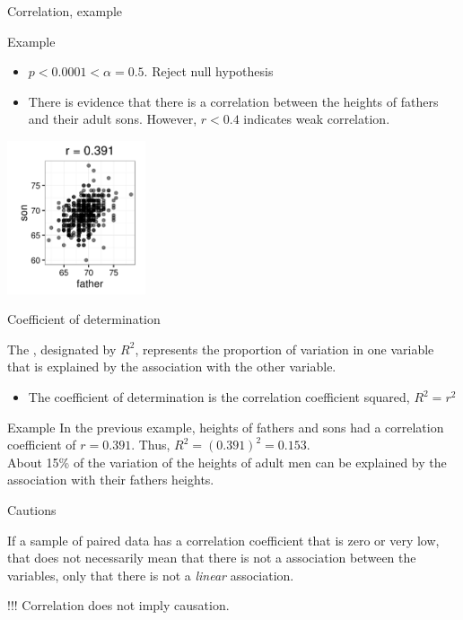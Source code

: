 \documentclass[xcolor=table, aspectratio=169, bigger]{beamer}
\begin{document}
\begin{frame}{Correlation, example}
\begin{exampleblock}{Example}
\begin{itemize}
\item $p < 0.0001 < \alpha = 0.5$. Reject null hypothesis
\item There is evidence that there is a correlation between the heights of fathers and their adult sons. However, $r < 0.4$ indicates weak correlation.
\end{itemize} 
\end{exampleblock}
\medskip
{\centering
\includegraphics[width=1.6in]{../images/ch10_cor_galton}
\par}
\end{frame}

\begin{frame}{Coefficient of determination}
\begin{block}{}
The , designated by $R^2$, represents the proportion of variation in one variable that is explained by the association with the other variable.
\begin{itemize}
\item The coefficient of determination is the correlation coefficient squared,  $R^2 = r^2$
\end{itemize}
\end{block}

\pause
\begin{exampleblock}{Example}
In the previous example, heights of fathers and sons had a correlation coefficient of $r=0.391$. Thus, $R^2 = (0.391)^2 = 0.153$.\\
\medskip
About 15\% of the variation of the heights of adult men can be explained by the association with their fathers heights.
\end{exampleblock}
\end{frame}

\begin{frame}{Cautions}
\begin{block}{}
If a sample of paired data has a correlation coefficient that is zero or very low, that does not necessarily mean that there is not a association between the variables, only that there is not a \emph{linear} association. 
\end{block}

\pause
\begin{alertblock}{!!!}
\large
Correlation does not imply causation.
\end{alertblock}
\end{frame}
\end{document}
